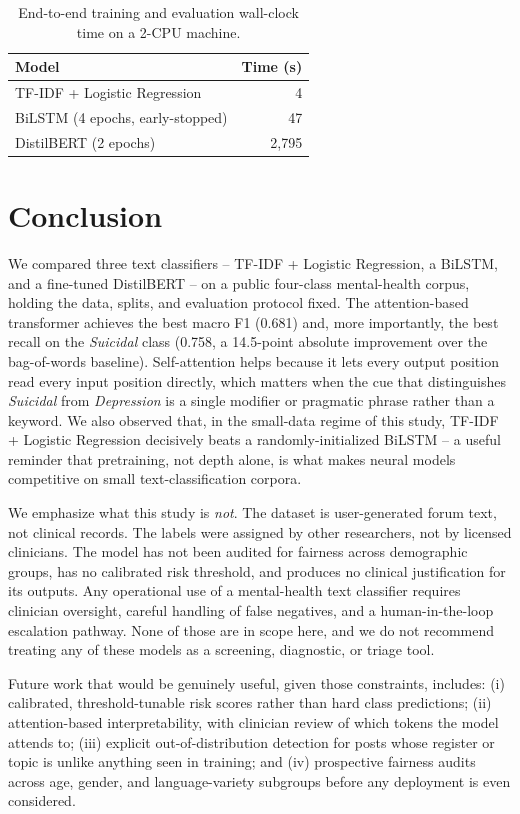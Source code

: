 \documentclass[12pt]{article}
\begin{document}
\begin{table}[h]
\centering
\caption{End-to-end training and evaluation wall-clock time on a 2-CPU machine.}
\label{tab:timing}
\begin{tabular}{lr}
\toprule
Model & Time (s) \\
\midrule
TF-IDF + Logistic Regression & 4 \\
BiLSTM (4 epochs, early-stopped) & 47 \\
DistilBERT (2 epochs) & 2{,}795 \\
\bottomrule
\end{tabular}
\end{table}

\section{Conclusion}

We compared three text classifiers -- TF-IDF + Logistic Regression, a
BiLSTM, and a fine-tuned DistilBERT -- on a public four-class
mental-health corpus, holding the data, splits, and evaluation
protocol fixed. The attention-based transformer achieves the best
macro F1 (0.681) and, more importantly, the best recall on the
\textit{Suicidal} class (0.758, a 14.5-point absolute improvement
over the bag-of-words baseline). Self-attention helps because it lets
every output position read every input position directly, which
matters when the cue that distinguishes \textit{Suicidal} from
\textit{Depression} is a single modifier or pragmatic phrase rather
than a keyword. We also observed that, in the small-data regime of
this study, TF-IDF + Logistic Regression decisively beats a
randomly-initialized BiLSTM -- a useful reminder that pretraining,
not depth alone, is what makes neural models competitive on small
text-classification corpora.

We emphasize what this study is \emph{not}. The dataset is
user-generated forum text, not clinical records. The labels were
assigned by other researchers, not by licensed clinicians. The model
has not been audited for fairness across demographic groups, has no
calibrated risk threshold, and produces no clinical justification for
its outputs. Any operational use of a mental-health text classifier
requires clinician oversight, careful handling of false negatives, and
a human-in-the-loop escalation pathway. None of those are in scope
here, and we do not recommend treating any of these models as a
screening, diagnostic, or triage tool.

Future work that would be genuinely useful, given those constraints,
includes: (i) calibrated, threshold-tunable risk scores rather than
hard class predictions; (ii) attention-based interpretability, with
clinician review of which tokens the model attends to; (iii) explicit
out-of-distribution detection for posts whose register or topic is
unlike anything seen in training; and (iv) prospective fairness audits
across age, gender, and language-variety subgroups before any
deployment is even considered.



\end{document}
